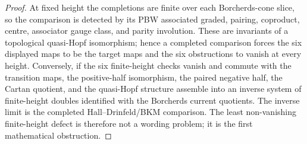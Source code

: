 \begin{proof}
At fixed height the completions are finite over each Borcherds-cone
slice, so the comparison is detected by its PBW associated graded,
pairing, coproduct, centre, associator gauge class, and parity
involution. These are
invariants of a topological quasi-Hopf isomorphism; hence a completed
comparison forces the six displayed maps to be the target maps and the
six obstructions to vanish at every height. Conversely, if the six
finite-height checks vanish and commute with the transition maps, the
positive-half isomorphism, the paired negative half, the Cartan quotient,
and the quasi-Hopf structure assemble into an inverse system of
finite-height doubles identified with the Borcherds current quotients.
The inverse limit is the completed Hall--Drinfeld/BKM comparison. The
least non-vanishing finite-height defect is therefore not a wording
problem; it is the first mathematical obstruction.
\end{proof}

